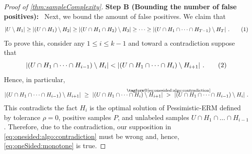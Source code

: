 \documentclass[11pt]{article}
\makeatletter
\theoremstyle{plain}
\theoremstyle{definition}
\theoremstyle{remark}
\newcommand{\yesnum}{\addtocounter{equation}{1}\tag{\theequation}}
\renewcommand{\eqref}[1]{\textup{\eqrefform@{\ref{#1}}}}
\let\eqrefform@\tagform@
\newcommand{\Stackrel}[2]{\stackrel{\mathmakebox[\widthof{\ensuremath{#2}}]{#1}}{#2}}
\def\abs#1{\left| #1 \right|}
\renewcommand{\paragraph}[1]{\medskip \noindent\textbf{#1}~}
\newcommand{\pERM}{Pessimistic-ERM}
\makeatother
\begin{document}
\begin{proof}[Proof of \cref{thm:sampleComplexity}]
        \paragraph{Step B (Bounding the number of false positives):}
            Next, we bound the amount of false positives.
            We claim that 
            \[
                \abs{U\setminus H_1}
                \geq 
                \abs{(U\cap H_1)\setminus H_2}
                \geq 
                \abs{(U\cap H_1\cap H_2)\setminus H_3}
                \geq 
                \dots 
                \geq 
                \abs{
                    (U\cap H_1\cap \dots \cap H_{T-1})
                    \setminus H_{T}
                }\,.
                \yesnum\label{eq:oneSided:monotone}
            \]
            To prove this, consider any $1\leq i\leq k-1$ and toward a contradiction suppose that 
            \[
                \abs{(U\cap H_1\cap \dots \cap H_{i-1})\setminus H_i}
                <
                \abs{(U\cap H_1\cap \dots \cap H_{i})\setminus H_{i+1}}\,.
                \yesnum\label{eq:onesided:algo:contradiction}
            \]
            Hence, in particular,
            \begin{align*}
                \abs{(U\cap H_1\cap \dots \cap H_{i-1})\setminus H_{i+1}}
                ~\geq~ \abs{(U\cap H_1\cap \dots \cap H_{i})\setminus H_{i+1}}
                ~\Stackrel{\eqref{eq:onesided:algo:contradiction}}{>}~ \abs{(U\cap H_1\cap \dots \cap H_{i-1})\setminus H_i}\,.
            \end{align*}
            This contradicts the fact $H_i$ is the optimal solution of \pERM{} defined by tolerance $\rho=0$, positive samples $P$, and unlabeled samples $U\cap H_1\cap \dots \cap H_{i-1}$.
            Therefore, due to the contradiction, our supposition in \cref{eq:onesided:algo:contradiction} must be wrong and, hence, \cref{eq:oneSided:monotone} is true.


\end{proof}
\end{document}

